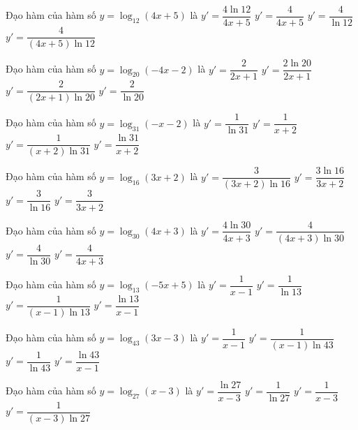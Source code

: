 \documentclass[12pt,a4paper]{article}
\begin{document}
\begin{ex}
Đạo hàm của hàm số $y=\log_{12}(4x+5)$ là
\choice
{$y'=\dfrac{4\ln{12}}{4x+5}$}
{$y'=\dfrac{4}{4x+5}$}
{$y'=\dfrac{4}{\ln{12}}$}
{\True $y'=\dfrac{4}{(4x+5)\ln 12}$}
\end{ex}
\begin{ex}
Đạo hàm của hàm số $y=\log_{20}(-4x-2)$ là
\choice
{$y'=\dfrac{2}{2x+1}$}
{$y'=\dfrac{2\ln{20}}{2x+1}$}
{\True $y'=\dfrac{2}{(2x+1)\ln 20}$}
{$y'=\dfrac{2}{\ln{20}}$}
\end{ex}
\begin{ex}
Đạo hàm của hàm số $y=\log_{31}(-x-2)$ là
\choice
{$y'=\dfrac{1}{\ln{31}}$}
{$y'=\dfrac{1}{x+2}$}
{\True $y'=\dfrac{1}{(x+2)\ln 31}$}
{$y'=\dfrac{\ln{31}}{x+2}$}
\end{ex}
\begin{ex}
Đạo hàm của hàm số $y=\log_{16}(3x+2)$ là
\choice
{\True $y'=\dfrac{3}{(3x+2)\ln 16}$}
{$y'=\dfrac{3\ln{16}}{3x+2}$}
{$y'=\dfrac{3}{\ln{16}}$}
{$y'=\dfrac{3}{3x+2}$}
\end{ex}
\begin{ex}
Đạo hàm của hàm số $y=\log_{30}(4x+3)$ là
\choice
{$y'=\dfrac{4\ln{30}}{4x+3}$}
{\True $y'=\dfrac{4}{(4x+3)\ln 30}$}
{$y'=\dfrac{4}{\ln{30}}$}
{$y'=\dfrac{4}{4x+3}$}
\end{ex}
\begin{ex}
Đạo hàm của hàm số $y=\log_{13}(-5x+5)$ là
\choice
{$y'=\dfrac{1}{x-1}$}
{$y'=\dfrac{1}{\ln{13}}$}
{\True $y'=\dfrac{1}{(x-1)\ln 13}$}
{$y'=\dfrac{\ln{13}}{x-1}$}
\end{ex}
\begin{ex}
Đạo hàm của hàm số $y=\log_{43}(3x-3)$ là
\choice
{$y'=\dfrac{1}{x-1}$}
{\True $y'=\dfrac{1}{(x-1)\ln 43}$}
{$y'=\dfrac{1}{\ln{43}}$}
{$y'=\dfrac{\ln{43}}{x-1}$}
\end{ex}
\begin{ex}
Đạo hàm của hàm số $y=\log_{27}(x-3)$ là
\choice
{$y'=\dfrac{\ln{27}}{x-3}$}
{$y'=\dfrac{1}{\ln{27}}$}
{$y'=\dfrac{1}{x-3}$}
{\True $y'=\dfrac{1}{(x-3)\ln 27}$}
\end{ex}
\end{document}
